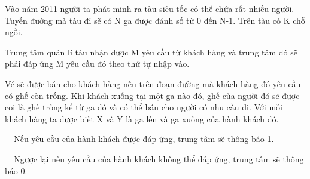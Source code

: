 Vào năm 2011 người ta phát minh ra tàu siêu tốc có thể chứa rất nhiều người. Tuyến đường mà tàu đi sẽ có N ga được đánh số từ 0 đến N-1. Trên tàu có K chỗ ngồi.  

   Trung tâm quản lí tàu nhận được M yêu cầu từ khách hàng và trung tâm đó sẽ phải đáp ứng M yêu cầu đó theo thứ tự nhập vào.  

   Vé sẽ được bán cho khách hàng nếu trên đoạn đường mà khách hàng đó yêu cầu có ghế còn trống. Khi khách xuống tại một ga nào đó, ghế của người đó sẽ được coi là ghế trống kể từ ga đó và có thể bán cho người có nhu cầu đi. Với mỗi khách hàng ta được biết X và Y là ga lên và ga xuống của hành khách đó.  

   \_ Nếu yêu cầu của hành khách được đáp ứng, trung tâm sẽ thông báo 1.  

   \_ Ngược lại nếu yêu cầu của hành khách không thể đáp ứng, trung tâm sẽ thông báo 0.